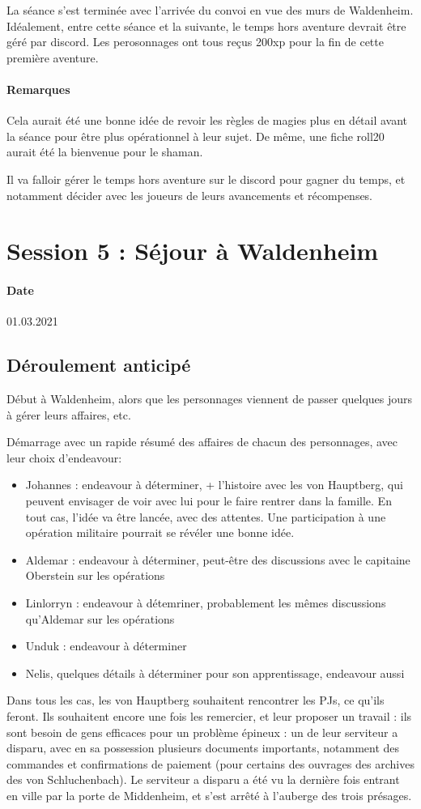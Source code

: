 \documentclass[10pt,a4paper]{book}
\begin{document}
La séance s'est terminée avec l'arrivée du convoi en vue des murs de Waldenheim. Idéalement, entre cette séance et la suivante, le temps hors aventure devrait être géré par discord. Les perosonnages ont tous reçus 200xp pour la fin de cette première aventure.

\paragraph{Remarques}
Cela aurait été une bonne idée de revoir les règles de magies plus en détail avant la séance pour être plus opérationnel à leur sujet. De même, une fiche roll20 aurait été la bienvenue pour le shaman.

Il va falloir gérer le temps hors aventure sur le discord pour gagner du temps, et notamment décider avec les joueurs de leurs avancements et récompenses.
\section{Session 5 : Séjour à Waldenheim}
\paragraph{Date}01.03.2021
\subsection{Déroulement anticipé}
Début à Waldenheim, alors que les personnages viennent de passer quelques jours à gérer leurs affaires, etc.

Démarrage avec un rapide résumé des affaires de chacun des personnages, avec leur choix d'endeavour:
\begin{itemize}
\item Johannes : endeavour à déterminer, + l'histoire avec les von Hauptberg, qui peuvent envisager de voir avec lui pour le faire rentrer dans la famille. En tout cas, l'idée va être lancée, avec des attentes. Une participation à une opération militaire pourrait se révéler une bonne idée.
\item Aldemar : endeavour à déterminer, peut-être des discussions avec le capitaine Oberstein sur les opérations
\item Linlorryn : endeavour à détemriner, probablement les mêmes discussions qu'Aldemar sur les opérations
\item Unduk : endeavour à déterminer
\item Nelis, quelques détails à déterminer pour son apprentissage, endeavour aussi
\end{itemize}
Dans tous les cas, les von Hauptberg souhaitent rencontrer les PJs, ce qu'ils feront. Ils souhaitent encore une fois les remercier, et leur proposer un travail : ils sont besoin de gens efficaces pour un problème épineux : un de leur serviteur a disparu, avec en sa possession plusieurs documents importants, notamment des commandes et confirmations de paiement (pour certains des ouvrages des archives des von Schluchenbach). Le serviteur a disparu a été vu la dernière fois entrant en ville par la porte de Middenheim, et s'est arrêté à l'auberge des trois présages.
\end{document}
